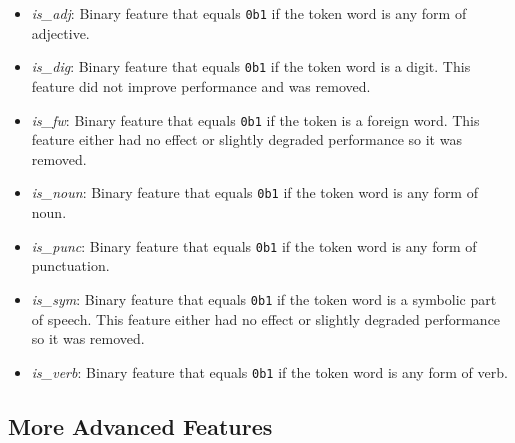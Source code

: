 \documentclass{article}
\begin{document}
\begin{itemize}
      \begin{itemize}
        \item \textit{is\_adj}: Binary feature that equals \texttt{0b1} if the token word is any form of adjective.
        \item \textit{is\_dig}: Binary feature that equals \texttt{0b1} if the token word is a digit.  This feature did not improve performance and was removed.
        \item \textit{is\_fw}: Binary feature that equals \texttt{0b1} if the token is a foreign word.  This feature either had no effect or slightly degraded performance so it was removed.
        \item \textit{is\_noun}: Binary feature that equals \texttt{0b1} if the token word is any form of noun.
        \item \textit{is\_punc}: Binary feature that equals \texttt{0b1} if the token word is any form of punctuation.
        \item \textit{is\_sym}: Binary feature that equals \texttt{0b1} if the token word is a symbolic part of speech.  This feature either had no effect or slightly degraded performance so it was removed.
        \item \textit{is\_verb}: Binary feature that equals \texttt{0b1} if the token word is any form of verb.
      \end{itemize}
  \end{itemize}

  \subsection{More Advanced Features}
\end{document}
